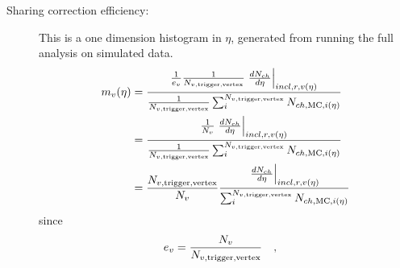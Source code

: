 \documentclass[11pt]{article}
\newcommand{\dndetadphi}[1][]{{\ensuremath%
    \ifx|#1|\else\left.\fi%
    \frac{d^2N_{ch}}{d\eta\,d\varphi}%
    \ifx|#1|\else\right|_{#1}\fi%
}}
\newcommand{\Nsel}{{\ensuremath N_{v,\text{trigger,vertex}}}}
\begin{document}
\begin{description}
\item[Sharing correction efficiency:] 
  This is a one dimension histogram in $\eta$, generated from running
  the full analysis on simulated data.   
  \begin{align}
    \label{eq:sharing_corr}
    m_v(\eta) &= \frac{
      \frac{1}{e_{v}}\frac1{\Nsel{}}\left.\frac{dN_{ch}}{d\eta}\right|_{incl,r,v(\eta)}}{
      \frac1{\Nsel}\sum_i^{\Nsel{}}N_{ch,\text{MC},i(\eta)}}
    \nonumber\\
    &=
    \frac{\frac1{N_v}\left.\frac{dN_{ch}}{d\eta}\right|_{incl,r,v(\eta)}}{
      \frac1{\Nsel}\sum_i^{\Nsel{}}N_{ch,\text{MC},i(\eta)}}\nonumber\\
    &= 
    \frac{\Nsel{}}{N_v}
    \frac{\left.\frac{dN_{ch}}{d\eta}\right|_{incl,r,v(\eta)}}{
      \sum_i^{\Nsel{}}N_{ch,\text{MC},i(\eta)}}
  \end{align}
  since
  \begin{align}
    e_{v} &= \frac{N_{v}}{\Nsel{}}\quad,

\end{align}
\end{description}
\end{document}
